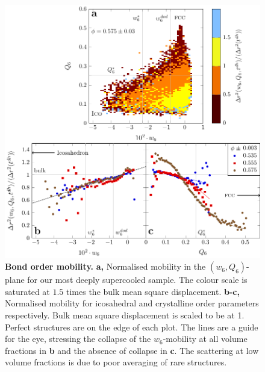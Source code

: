 \begin{figure}
\begin{center}
\includegraphics{generate_figures-figure2.pdf}
\end{center}
\caption{\textbf{Bond order mobility.} {\bf a,} Normalised mobility in the $(w_6, Q_6)$-plane for our most deeply supercooled sample. The colour scale is saturated at $1.5$ times the bulk mean square displacement. {\bf b-c,} Normalised mobility for icosahedral and crystalline order parameters respectively. Bulk mean square displacement is scaled to be at 1. Perfect structures are on the edge of each plot. The lines are a guide for the eye, stressing the collapse of the $w_6$-mobility at all volume fractions in {\bf b} and the absence of collapse in {\bf c}. The scattering at low volume fractions is due to poor averaging of rare structures.}
	\label{fig:msd_Q6_w6}
\end{figure}

\clearpage

